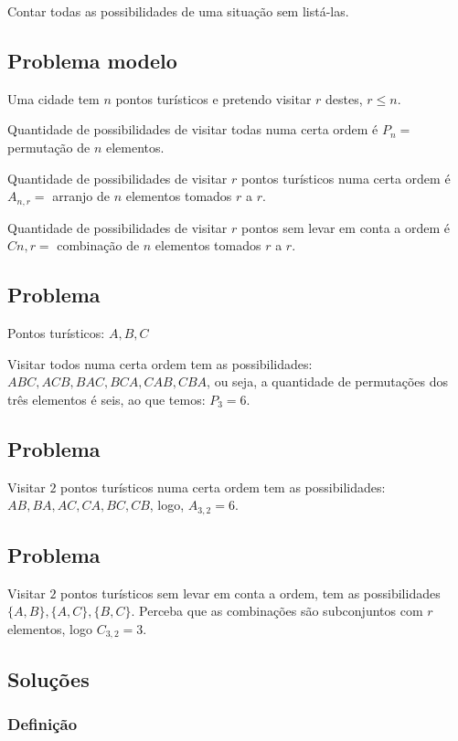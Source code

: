 \documentclass[a4paper]{article}
\begin{document}
	Contar todas as possibilidades de uma situação sem listá-las.
	
	\subsection{Problema modelo}
	
	\noindent Uma cidade tem $n$ pontos turísticos e pretendo visitar $r$ destes, $r \leq n$.
	
	Quantidade de possibilidades de visitar todas numa certa ordem é $P_n =$ permutação de $n$ elementos.
	
	Quantidade de possibilidades de visitar $r$ pontos turísticos numa certa ordem é $A_{n,r} =$ arranjo de $n$ elementos tomados $r$ a $r$.
	
	Quantidade de possibilidades de visitar $r$ pontos sem levar em conta a ordem é $Cn,r =$ combinação de $n$ elementos tomados $r$ a $r$.
	
	\subsection{Problema}
	
	Pontos turísticos: $A, B, C$
	
	Visitar todos numa certa ordem tem as possibilidades: $ABC, ACB, BAC, BCA, CAB, CBA$, ou seja, a quantidade de permutações dos três elementos é seis, ao que temos: $P_3 = 6$.
	
	\subsection{Problema}
	
	Visitar $2$ pontos turísticos numa certa ordem tem as possibilidades: $AB, BA, AC, CA, BC, CB$, logo, $A_{3,2} = 6$.
	
	\subsection{Problema}
	
	Visitar $2$ pontos turísticos sem levar em conta a ordem, tem as possibilidades $\{A,B\}, \{A,C\}, \{B,C\}$. Perceba que as combinações são subconjuntos com $r$ elementos, logo $C_{3,2} = 3$.
	
	\subsection{Soluções}
	
	\subsubsection{Definição}
	
\end{document}
